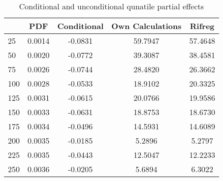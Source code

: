 \begin{table}[htbp]\centering
\caption{Conditional and unconditional qunatile partial effects}
\begin{tabular}{l*{4}{c}}
\toprule
            &         PDF& Conditional&Own Calculations&      Rifreg\\
\midrule
25          &      0.0014&     -0.0831&     59.7947&     57.4648\\
50          &      0.0020&     -0.0772&     39.3087&     38.4581\\
75          &      0.0026&     -0.0744&     28.4820&     26.3662\\
100         &      0.0028&     -0.0533&     18.9102&     20.3325\\
125         &      0.0031&     -0.0615&     20.0766&     19.9586\\
150         &      0.0033&     -0.0631&     18.8753&     18.6730\\
175         &      0.0034&     -0.0496&     14.5931&     14.6089\\
200         &      0.0035&     -0.0185&      5.2896&      5.2797\\
225         &      0.0035&     -0.0443&     12.5047&     12.2233\\
250         &      0.0036&     -0.0205&      5.6894&      6.3022\\
\bottomrule
\end{tabular}
\end{table}
